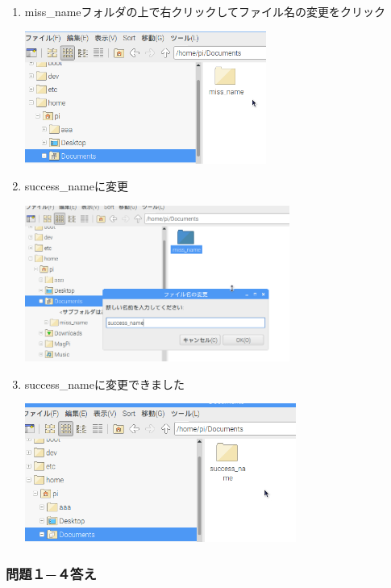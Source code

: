 \documentclass[a4paper,12pt]{jarticle}
\begin{document}
\begin{enumerate}
  \item
        miss\_nameフォルダの上で右クリックしてファイル名の変更をクリック

        \centering
        \includegraphics[width=7.913cm,height=4.344cm]{textbook-img214.png}
        \flushleft

  \item success\_nameに変更

        \centering
        \includegraphics[width=8.694cm,height=5.115cm]{textbook-img215.png}
        \flushleft
  \item success\_nameに変更できました

        \centering
        \includegraphics[width=8.895cm,height=4.542cm]{textbook-img216.png}
        \flushleft
\end{enumerate}



\subsubsection{\bfseries
  問題１−４答え}
\end{document}
